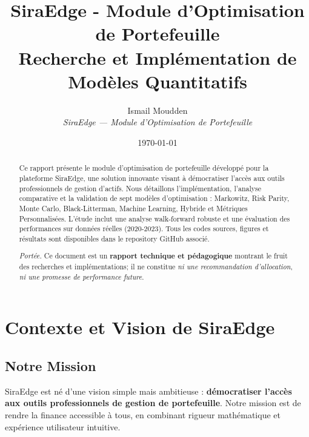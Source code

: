 \documentclass[11pt,a4paper]{article}
\begin{document}
\title{\textbf{SiraEdge - Module d'Optimisation de Portefeuille}\\[0.9em]
\large{Recherche et Implémentation de Modèles Quantitatifs}}

\author{Ismail Moudden\\[0.6em]
\textit{SiraEdge — Module d'Optimisation de Portefeuille}}

\date{\today}

\begin{titlepage}
\thispagestyle{empty}
\maketitle
\vspace{2em}

\begin{abstract}
Ce rapport présente le module d'optimisation de portefeuille développé pour la plateforme SiraEdge, une solution innovante visant à démocratiser l'accès aux outils professionnels de gestion d'actifs. Nous détaillons l'implémentation, l'analyse comparative et la validation de sept modèles d'optimisation : Markowitz, Risk Parity, Monte Carlo, Black-Litterman, Machine Learning, Hybride et Métriques Personnalisées. L'étude inclut une analyse walk-forward robuste et une évaluation des performances sur données réelles (2020-2023). Tous les codes sources, figures et résultats sont disponibles dans le repository GitHub associé.
\medskip\par\noindent\textit{Portée.} Ce document est un \textbf{rapport technique et pédagogique} montrant le fruit des recherches et implémentations; il ne constitue \emph{ni une recommandation d'allocation}, \emph{ni une promesse de performance future}.
\end{abstract}

\vfill
\end{titlepage}

\section*{Contexte et Vision de SiraEdge}

\subsection*{Notre Mission}
SiraEdge est né d'une vision simple mais ambitieuse : \textbf{démocratiser l'accès aux outils professionnels de gestion de portefeuille}. Notre mission est de rendre la finance accessible à tous, en combinant rigueur mathématique et expérience utilisateur intuitive.
\end{document}

